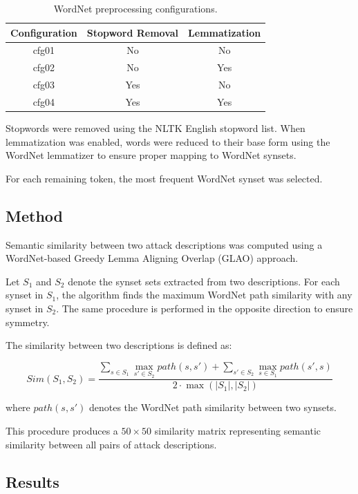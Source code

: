 \documentclass[conference]{IEEEtran}
\begin{document}
\begin{table}[h]
\centering
\begin{tabular}{ccc}
\hline
Configuration & Stopword Removal & Lemmatization \\
\hline
cfg01 & No & No \\
cfg02 & No & Yes \\
cfg03 & Yes & No \\
cfg04 & Yes & Yes \\
\hline
\end{tabular}
\caption{WordNet preprocessing configurations.}
\label{tab:WNbased_configs}
\end{table}

Stopwords were removed using the NLTK English stopword list. When lemmatization was enabled, words were reduced to their base form using the WordNet lemmatizer to ensure proper mapping to WordNet synsets.

For each remaining token, the most frequent WordNet synset was selected.

\subsection{Method}

Semantic similarity between two attack descriptions was computed using a WordNet-based Greedy Lemma Aligning Overlap (GLAO) approach.

Let $S_1$ and $S_2$ denote the synset sets extracted from two descriptions. For each synset in $S_1$, the algorithm finds the maximum WordNet path similarity with any synset in $S_2$. The same procedure is performed in the opposite direction to ensure symmetry.

The similarity between two descriptions is defined as:

\begin{equation}
Sim(S_1,S_2)=
\frac{
\sum_{s\in S_1} \max_{s'\in S_2} path(s,s') +
\sum_{s'\in S_2} \max_{s\in S_1} path(s',s)
}{2 \cdot \max(|S_1|,|S_2|)}
\end{equation}

where $path(s,s')$ denotes the WordNet path similarity between two synsets.

This procedure produces a $50 \times 50$ similarity matrix representing semantic similarity between all pairs of attack descriptions.

\subsection{Results}
\end{document}
